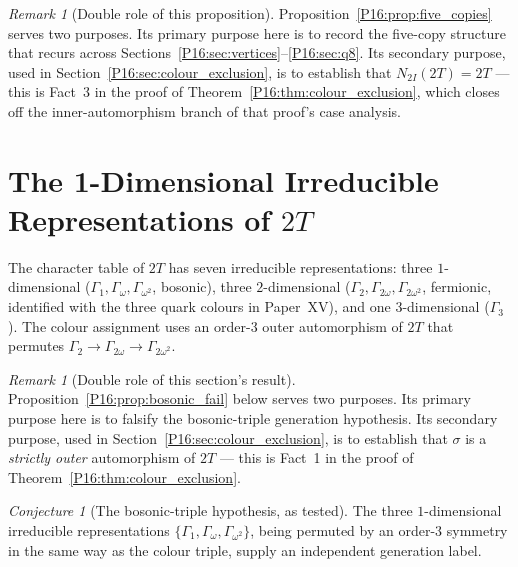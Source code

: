 \documentclass[11pt,a4paper]{article}
\theoremstyle{definition}\newtheorem{definition}[theorem]{Definition}
\theoremstyle{remark}
\newtheorem{remark}[theorem]{Remark}
\newtheorem{conjecture}[theorem]{Conjecture}
\theoremstyle{definition}\newtheorem{construction}[theorem]{Construction}
\newcommand{\twoI}{2I}
\newcommand{\twoT}{2T}
\begin{document}
\begin{remark}[Double role of this proposition]
\label{P16:rem:double_role_proposition}
Proposition~\ref{P16:prop:five_copies} serves two purposes.  Its primary
purpose here is to record the five-copy structure that recurs across
Sections~\ref{P16:sec:vertices}--\ref{P16:sec:q8}.  Its secondary purpose,
used in Section~\ref{P16:sec:colour_exclusion}, is to establish that
$N_{\twoI}(\twoT)=\twoT$ --- this is Fact~3 in the proof of
Theorem~\ref{P16:thm:colour_exclusion}, which closes off the inner-automorphism
branch of that proof's case analysis.
\end{remark}

\section{The 1-Dimensional Irreducible Representations of $\twoT$}
\label{P16:sec:colourauto}

The character table of $\twoT$ has seven irreducible representations:
three $1$-dimensional ($\Gamma_1,\Gamma_\omega,\Gamma_{\omega^2}$,
bosonic), three $2$-dimensional ($\Gamma_2,\Gamma_{2\omega},
\Gamma_{2\omega^2}$, fermionic, identified with the three quark
colours in Paper~XV), and one $3$-dimensional
($\Gamma_3$). The colour assignment uses an order-$3$ outer
automorphism of $\twoT$ that permutes
$\Gamma_2\to\Gamma_{2\omega}\to\Gamma_{2\omega^2}$.

\begin{remark}[Double role of this section's result]
\label{P16:rem:double_role_section}
Proposition~\ref{P16:prop:bosonic_fail} below serves two purposes.
Its primary purpose here is to falsify the bosonic-triple generation
hypothesis.  Its secondary purpose, used in
Section~\ref{P16:sec:colour_exclusion}, is to establish that $\sigma$ is a
\emph{strictly outer} automorphism of $\twoT$ --- this is Fact~1 in
the proof of Theorem~\ref{P16:thm:colour_exclusion}.
\end{remark}

\begin{conjecture}[The bosonic-triple hypothesis, as tested]
\label{P16:conj:bosonic}
The three $1$-dimensional irreducible representations
$\{\Gamma_1,\Gamma_\omega,\Gamma_{\omega^2}\}$, being permuted by an
order-$3$ symmetry in the same way as the colour triple, supply an
independent generation label.
\end{conjecture}
\end{document}
